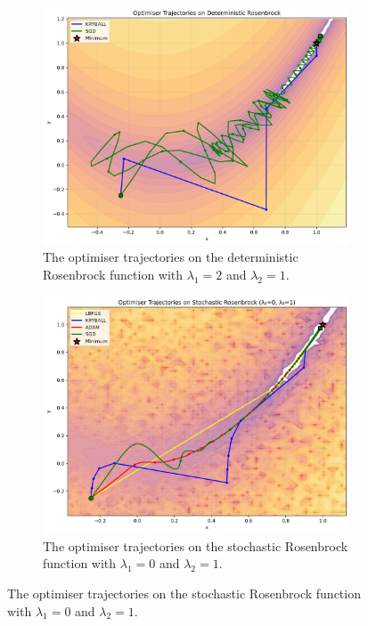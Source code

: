 \begin{figure}[!t]
    \begin{subfigure}[b]{0.49\linewidth}
        \centering
        \includegraphics[width=\linewidth]{figures/5evals/deterministic.png}
        \caption{The optimiser trajectories on the deterministic Rosenbrock function with $\lambda_1 = 2$ and $\lambda_2 = 1$.}
        \label{fig:deterministic}
    \end{subfigure}
    \hfill
    \begin{subfigure}[b]{0.49\linewidth}
        \centering
        \includegraphics[width=\linewidth]{figures/5evals/stochastic_0_1.png}
        \caption{The optimiser trajectories on the stochastic Rosenbrock function with $\lambda_1 = 0$ and $\lambda_2 = 1$.}
        \label{fig:stochastic_1}
    \end{subfigure}
    

\end{figure}
